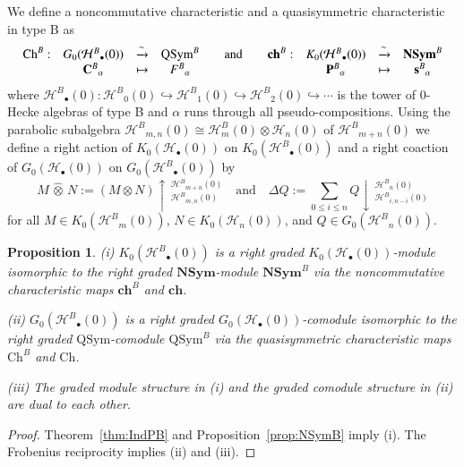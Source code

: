 \documentclass{amsart}
\newtheorem{proposition}[theorem]{Proposition}
\newtheorem*{Young's Rule}{Young's Rule}
\theoremstyle{definition}
\theoremstyle{remark}
\numberwithin{equation}{section}
\begin{document}
We define a noncommutative characteristic and a quasisymmetric characteristic in type B as
\[ \begin{array}{ccccccccc}
\mathrm{Ch}^B: & G_0({\mathcal{H}^B}_\bullet(0)) & \xrightarrow\sim & {\mathrm{QSym}}^B & \quad{\rm and}\quad & \mathbf{ch}^B: & K_0({\mathcal{H}^B}_\bullet(0)) & \xrightarrow\sim & {\mathbf{NSym}}^B \\
& {\mathbf{C}^B}_\alpha & \mapsto & {F^B}_\alpha & & & {\mathbf{P}^B}_\alpha & \mapsto & {\mathbf{s}^B}_\alpha
\end{array} \]
where ${\mathcal{H}^B}_\bullet(0): {\mathcal{H}^B}_0(0)\hookrightarrow {\mathcal{H}^B}_1(0) \hookrightarrow {\mathcal{H}^B}_2(0) \hookrightarrow\cdots$ is the tower of 0-Hecke algebras of type B and $\alpha$ runs through all pseudo-compositions. Using the parabolic subalgebra ${\mathcal{H}^B}_{m,n}(0)\cong{\mathcal{H}}^B_m(0)\otimes{\mathcal{H}}_n(0)$ of ${\mathcal{H}^B}_{m+n}(0)$ we define a right action of $K_0({\mathcal{H}}_\bullet(0))$ on $K_0({\mathcal{H}^B}_\bullet(0))$ and  a right coaction of $G_0({\mathcal{H}}_\bullet(0))$ on $G_0({\mathcal{H}^B}_\bullet(0))$ by
\[ M \,\widehat{\otimes}\, N := (M\otimes N)\uparrow\,_{{\mathcal{H}^B}_{m,n}(0)}^{{\mathcal{H}^B}_{m+n}(0)}
{\quad\text{and}\quad}  \Delta Q := \sum_{0\le i\le n} Q\downarrow\,_{{\mathcal{H}^B}_{i,n-i}(0)}^{{\mathcal{H}^B}_{n}(0)} \]
for all $M\in K_0({\mathcal{H}^B}_m(0))$, $N\in K_0({\mathcal{H}}_n(0))$, and $Q\in G_0({\mathcal{H}^B}_n(0))$. 

\begin{proposition}
(i) $K_0({\mathcal{H}^B}_\bullet(0))$ is a right graded $K_0({\mathcal{H}}_\bullet(0))$-module isomorphic to the right graded ${\mathbf{NSym}}$-module ${\mathbf{NSym}}^B$ via the noncommutative characteristic maps $\mathbf{ch}^B$ and $\mathbf{ch}$.

\noindent (ii) $G_0({\mathcal{H}^B}_\bullet(0))$ is a right graded $G_0({\mathcal{H}}_\bullet(0))$-comodule isomorphic to the right graded ${\mathrm{QSym}}$-comodule ${\mathrm{QSym}}^B$ via the quasisymmetric characteristic maps $\mathrm{Ch}^B$ and $\mathrm{Ch}$.

\noindent(iii) The graded module structure in (i) and the graded comodule structure in (ii) are dual to each other.
\end{proposition}

\begin{proof}
Theorem~\ref{thm:IndPB} and Proposition~\ref{prop:NSymB} imply (i). The Frobenius reciprocity implies (ii) and (iii).
\end{proof}
\end{document}
